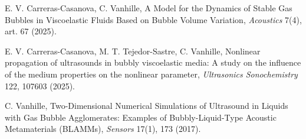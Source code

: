 \documentclass[11pt,a4paper]{article}
\begin{document}
\begin{sincabstract}
\begin{enumerate}[label={[\arabic*]},leftmargin=*]
\item E. V. Carreras-Casanova, C. Vanhille, A Model for the Dynamics of Stable Gas Bubbles in Viscoelastic Fluids Based on Bubble Volume Variation, \textit{Acoustics} 7(4), art. 67 (2025).
\item E. V. Carreras-Casanova, M. T. Tejedor-Sastre, C. Vanhille, Nonlinear propagation of ultrasounds in bubbly viscoelastic media: A study on the influence of the medium properties on the nonlinear parameter, \textit{Ultrasonics Sonochemistry} 122, 107603 (2025).
\item C. Vanhille, Two-Dimensional Numerical Simulations of Ultrasound in Liquids with Gas Bubble Agglomerates: Examples of Bubbly-Liquid-Type Acoustic Metamaterials (BLAMMs), \textit{Sensors} 17(1), 173 (2017).
\end{enumerate}
\end{sincabstract}

\end{document}
